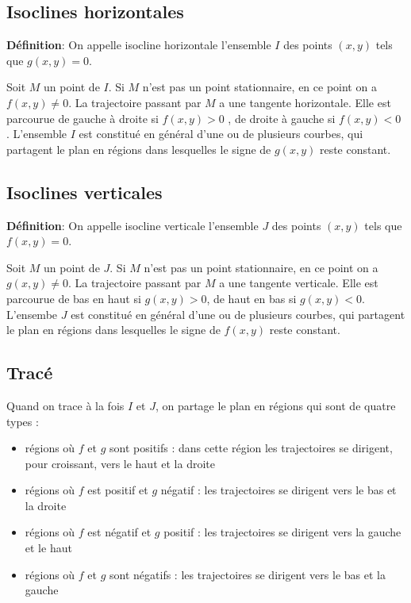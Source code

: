 \documentclass[a4paper,12pt]{article}
\begin{document}
    \subsection{Isoclines horizontales}
    \label{subs:Isoclines horizontales}
      \par \textbf{Définition}: On appelle isocline horizontale l'ensemble $I$ des points $(x,y)$ tels que $g(x,y) = 0$.\\
      \par Soit $M$ un point de $I$.
      Si $M$ n'est pas un point stationnaire, en ce point on a $f(x,y) \neq 0$.
      La trajectoire passant par $M$ a une tangente horizontale.
      Elle est parcourue de gauche à droite si $f(x,y) > 0$ , de droite à gauche si $f(x,y) < 0$ .
      L'ensemble $I$ est constitué en général d'une ou de plusieurs courbes, qui partagent le plan en régions dans lesquelles le signe de $g(x,y)$ reste constant.

    \subsection{Isoclines verticales}
    \label{subs:Isoclines verticales}
      \par \textbf{Définition}: On appelle isocline verticale l'ensemble $J$ des points $(x,y)$ tels que $f(x,y) = 0$.\\
      \par Soit $M$ un point de $J$.
      Si $M$ n'est pas un point stationnaire, en ce point on a $g(x,y) \neq 0$.
      La trajectoire passant par $M$ a une tangente verticale.
      Elle est parcourue de bas en haut si $g(x,y) > 0$, de haut en bas si $g(x,y) < 0$.
      L'ensembe $J$ est constitué en général d'une ou de plusieurs courbes, qui partagent le plan en régions dans lesquelles le signe de $f(x,y)$ reste constant.

    \subsection{Tracé}
    \label{sub:Tracé}
      \par Quand on trace à la fois $I$ et $J$, on partage le plan en régions qui sont de quatre types :
      \begin{itemize}
        \item régions où $f$ et $g$ sont positifs : dans cette région les trajectoires se dirigent, pour   croissant, vers le haut et la droite
        \item régions où $f$ est positif et $g$ négatif : les trajectoires se dirigent vers le bas et la droite
        \item régions où $f$ est négatif et $g$ positif : les trajectoires se dirigent vers la gauche et le haut
        \item régions où $f$ et $g$ sont négatifs : les trajectoires se dirigent vers le bas et la gauche
      \end{itemize}
\end{document}

